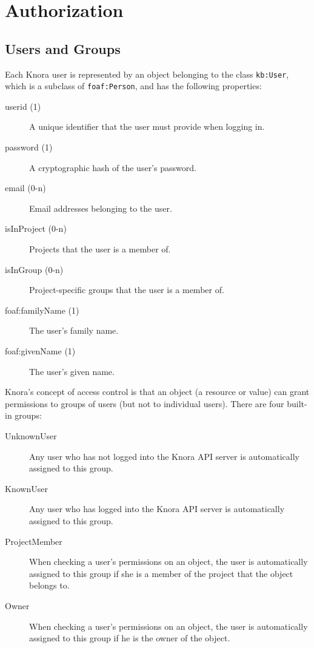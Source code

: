 \documentclass[12pt, a4paper]{article}
\begin{document}
\section{Authorization}

\label{sec:authorization}

\subsection{Users and Groups}

\label{subsec:users-and-groups}

Each Knora user is represented by an object belonging to the class \texttt{kb:User}, which is a subclass of \texttt{foaf:Person}, and has the following properties:

\begin{description}
	\item[userid (1)] A unique identifier that the user must provide when logging in.
	\item[password (1)] A cryptographic hash of the user's password.
	\item[email (0-n)] Email addresses belonging to the user.
	\item[isInProject (0-n)] Projects that the user is a member of.
	\item[isInGroup (0-n)] Project-specific groups that the user is a member of.
	\item[foaf:familyName (1)] The user's family name.
	\item[foaf:givenName (1)] The user's given name.
\end{description}

Knora's concept of access control is that an object (a resource or value) can grant permissions to groups of users (but not to individual users). There are four built-in groups:

\begin{description}
	\item[UnknownUser] Any user who has not logged into the Knora API server is automatically assigned to this group.
	\item[KnownUser] Any user who has logged into the Knora API server is automatically assigned to this group.
	\item[ProjectMember] When checking a user's permissions on an object, the user is automatically assigned to this group if she is a member of the project that the object belongs to.
	\item[Owner] When checking a user's permissions on an object, the user is automatically assigned to this group if he is the owner of the object.
\end{description}
\end{document}
